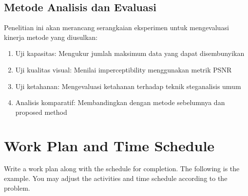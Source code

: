 \documentclass{ittelkom}
\begin{document}
\subsection{Metode Analisis dan Evaluasi}

Penelitian ini akan merancang serangkaian eksperimen untuk mengevaluasi kinerja
metode yang diusulkan:
\begin{enumerate}
    \item Uji kapasitas: Mengukur jumlah maksimum data yang dapat disembunyikan
    \item Uji kualitas visual: Menilai imperceptibility menggunakan metrik PSNR
    \item Uji ketahanan: Mengevaluasi ketahanan terhadap teknik steganalisis umum
    \item Analisis komparatif: Membandingkan dengan metode sebelumnya dan proposed method
\end{enumerate}





\section{Work Plan and Time Schedule}
Write a work plan along with the schedule for completion. The following is the
example. You may adjust the activities and time schedule according to the
problem. \newline
\end{document}
